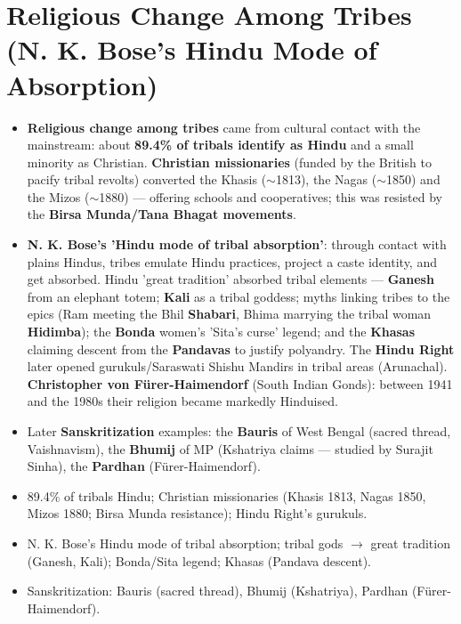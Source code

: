 \section{Religious Change Among Tribes (N. K. Bose's Hindu Mode of Absorption)}

\begin{KeyConcept}
\begin{itemize}
\item \textbf{Religious change among tribes} came from cultural contact with the mainstream: about \textbf{89.4\% of tribals identify as Hindu} and a small minority as Christian. \textbf{Christian missionaries} (funded by the British to pacify tribal revolts) converted the Khasis ($\sim$1813), the Nagas ($\sim$1850) and the Mizos ($\sim$1880) --- offering schools and cooperatives; this was resisted by the \textbf{Birsa Munda/Tana Bhagat movements}.
\item \textbf{N. K. Bose's 'Hindu mode of tribal absorption'}: through contact with plains Hindus, tribes emulate Hindu practices, project a caste identity, and get absorbed. Hindu 'great tradition' absorbed tribal elements --- \textbf{Ganesh} from an elephant totem; \textbf{Kali} as a tribal goddess; myths linking tribes to the epics (Ram meeting the Bhil \textbf{Shabari}, Bhima marrying the tribal woman \textbf{Hidimba}); the \textbf{Bonda} women's 'Sita's curse' legend; and the \textbf{Khasas} claiming descent from the \textbf{Pandavas} to justify polyandry. The \textbf{Hindu Right} later opened gurukuls/Saraswati Shishu Mandirs in tribal areas (Arunachal). \textbf{Christopher von Fürer-Haimendorf} (South Indian Gonds): between 1941 and the 1980s their religion became markedly Hinduised.
\item Later \textbf{Sanskritization} examples: the \textbf{Bauris} of West Bengal (sacred thread, Vaishnavism), the \textbf{Bhumij} of MP (Kshatriya claims --- studied by Surajit Sinha), the \textbf{Pardhan} (Fürer-Haimendorf).
\end{itemize}
\end{KeyConcept}

\begin{QuickRevision}
\begin{itemize}
\item 89.4\% of tribals Hindu; Christian missionaries (Khasis 1813, Nagas 1850, Mizos 1880; Birsa Munda resistance); Hindu Right's gurukuls.
\item N. K. Bose's Hindu mode of tribal absorption; tribal gods $\rightarrow$ great tradition (Ganesh, Kali); Bonda/Sita legend; Khasas (Pandava descent).
\item Sanskritization: Bauris (sacred thread), Bhumij (Kshatriya), Pardhan (Fürer-Haimendorf).
\end{itemize}
\end{QuickRevision}

